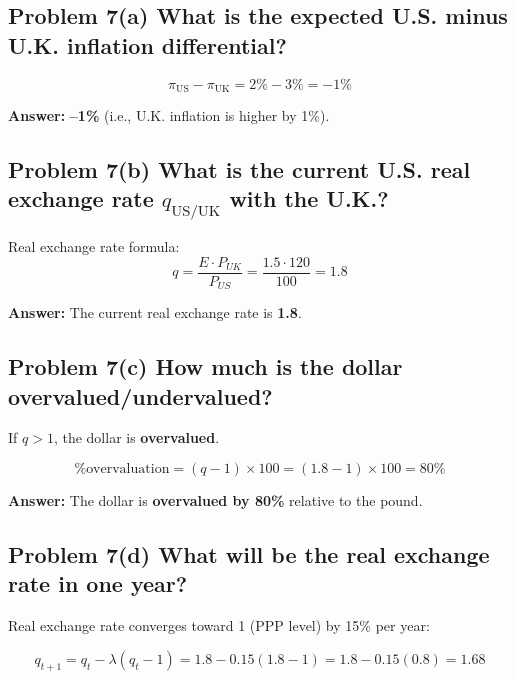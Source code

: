 \documentclass[
]{article}
\begin{document}
\subsection{Problem 7(a) What is the expected U.S. minus U.K. inflation
differential?}\label{problem-7a-what-is-the-expected-u.s.-minus-u.k.-inflation-differential}

\[
\pi_{\text{US}} - \pi_{\text{UK}} = 2\% - 3\% = -1\%
\]

\textbf{Answer:} \textbf{--1\%} (i.e., U.K. inflation is higher by 1\%).

\subsection{\texorpdfstring{Problem 7(b) What is the current U.S. real
exchange rate \(q_{\text{US/UK}}\) with the
U.K.?}{Problem 7(b) What is the current U.S. real exchange rate q\_\{\textbackslash text\{US/UK\}\} with the U.K.?}}\label{problem-7b-what-is-the-current-u.s.-real-exchange-rate-q_textusuk-with-the-u.k.}

Real exchange rate formula: \[
q = \frac{E \cdot P_{UK}}{P_{US}} = \frac{1.5 \cdot 120}{100} = 1.8
\]

\textbf{Answer:} The current real exchange rate is \textbf{1.8}.

\subsection{Problem 7(c) How much is the dollar
overvalued/undervalued?}\label{problem-7c-how-much-is-the-dollar-overvaluedundervalued}

If \(q > 1\), the dollar is \textbf{overvalued}.

\[
\% \text{overvaluation} = (q - 1) \times 100 = (1.8 - 1) \times 100 = 80\%
\]

\textbf{Answer:} The dollar is \textbf{overvalued by 80\%} relative to
the pound.

\subsection{Problem 7(d) What will be the real exchange rate in one
year?}\label{problem-7d-what-will-be-the-real-exchange-rate-in-one-year}

Real exchange rate converges toward 1 (PPP level) by 15\% per year:

\[
q_{t+1} = q_t - \lambda (q_t - 1) = 1.8 - 0.15(1.8 - 1) = 1.8 - 0.15(0.8) = 1.68
\]
\end{document}

